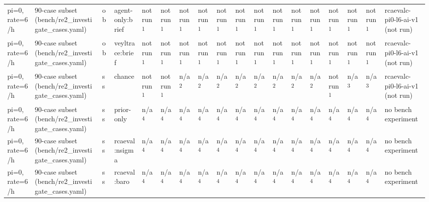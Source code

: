 \begin{table}[t]
\begin{tabular}{llllllllllllllllll}
pi=0, rate=6/h & 90-case subset (bench/re2\_investigate\_cases.yaml) & ob & agent-only:brief & not run\textsuperscript{1} & not run\textsuperscript{1} & not run\textsuperscript{1} & not run\textsuperscript{1} & not run\textsuperscript{1} & not run\textsuperscript{1} & not run\textsuperscript{1} & not run\textsuperscript{1} & not run\textsuperscript{1} & not run\textsuperscript{1} & not run\textsuperscript{1} & not run\textsuperscript{1} & not run\textsuperscript{1} & rcaevalc-pi0-l6-ai-v1 (not run) \\
pi=0, rate=6/h & 90-case subset (bench/re2\_investigate\_cases.yaml) & ob & veyltrace:brief & not run\textsuperscript{1} & not run\textsuperscript{1} & not run\textsuperscript{1} & not run\textsuperscript{1} & not run\textsuperscript{1} & not run\textsuperscript{1} & not run\textsuperscript{1} & not run\textsuperscript{1} & not run\textsuperscript{1} & not run\textsuperscript{1} & not run\textsuperscript{1} & not run\textsuperscript{1} & not run\textsuperscript{1} & rcaevalc-pi0-l6-ai-v1 (not run) \\
pi=0, rate=6/h & 90-case subset (bench/re2\_investigate\_cases.yaml) & ss & chance & not run\textsuperscript{1} & not run\textsuperscript{1} & n/a\textsuperscript{2} & n/a\textsuperscript{2} & n/a\textsuperscript{2} & n/a\textsuperscript{2} & n/a\textsuperscript{2} & n/a\textsuperscript{2} & n/a\textsuperscript{2} & n/a\textsuperscript{2} & not run\textsuperscript{1} & n/a\textsuperscript{3} & n/a\textsuperscript{3} & rcaevalc-pi0-l6-ai-v1 (not run) \\
pi=0, rate=6/h & 90-case subset (bench/re2\_investigate\_cases.yaml) & ss & prior-only & n/a\textsuperscript{4} & n/a\textsuperscript{4} & n/a\textsuperscript{4} & n/a\textsuperscript{4} & n/a\textsuperscript{4} & n/a\textsuperscript{4} & n/a\textsuperscript{4} & n/a\textsuperscript{4} & n/a\textsuperscript{4} & n/a\textsuperscript{4} & n/a\textsuperscript{4} & n/a\textsuperscript{4} & n/a\textsuperscript{4} & no bench experiment \\
pi=0, rate=6/h & 90-case subset (bench/re2\_investigate\_cases.yaml) & ss & rcaeval:nsigma & n/a\textsuperscript{4} & n/a\textsuperscript{4} & n/a\textsuperscript{4} & n/a\textsuperscript{4} & n/a\textsuperscript{4} & n/a\textsuperscript{4} & n/a\textsuperscript{4} & n/a\textsuperscript{4} & n/a\textsuperscript{4} & n/a\textsuperscript{4} & n/a\textsuperscript{4} & n/a\textsuperscript{4} & n/a\textsuperscript{4} & no bench experiment \\
pi=0, rate=6/h & 90-case subset (bench/re2\_investigate\_cases.yaml) & ss & rcaeval:baro & n/a\textsuperscript{4} & n/a\textsuperscript{4} & n/a\textsuperscript{4} & n/a\textsuperscript{4} & n/a\textsuperscript{4} & n/a\textsuperscript{4} & n/a\textsuperscript{4} & n/a\textsuperscript{4} & n/a\textsuperscript{4} & n/a\textsuperscript{4} & n/a\textsuperscript{4} & n/a\textsuperscript{4} & n/a\textsuperscript{4} & no bench experiment \\

\end{tabular}
\end{table}
